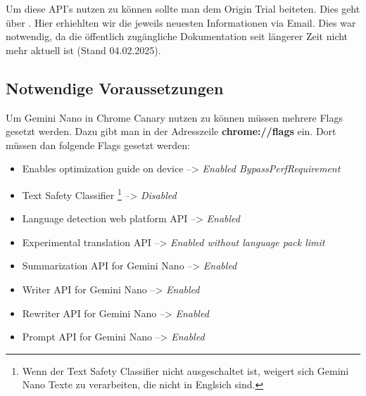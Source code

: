 Um diese API's nutzen zu können sollte man dem Origin Trial beiteten. Dies geht über \cite{gemini-nano-origin-trial}. Hier erhiehlten wir die jeweils neuesten Informationen via Email. Dies war notwendig, da die öffentlich zugängliche Dokumentation seit längerer Zeit nicht mehr aktuell ist (Stand 04.02.2025).

\subsection{Notwendige Voraussetzungen}

Um Gemini Nano in Chrome Canary nutzen zu können müssen mehrere Flags gesetzt werden. Dazu gibt man in der Adresszeile \textbf{chrome://flags} ein. Dort müssen dan folgende Flags gesetzt werden:
\begin{itemize}
    \item Enables optimization guide on device --> \emph{Enabled BypassPerfRequirement}
    \item Text Safety Classifier \footnote{Wenn der Text Safety Classifier nicht ausgeschaltet ist, weigert sich Gemini Nano Texte zu verarbeiten, die nicht in Englsich sind.} --> \emph{Disabled}
    \item Language detection web platform API --> \emph{Enabled}
    \item Experimental translation API --> \emph{Enabled without language pack limit}
    \item Summarization API for Gemini Nano --> \emph{Enabled}
    \item Writer API for Gemini Nano --> \emph{Enabled}
    \item Rewriter API for Gemini Nano --> \emph{Enabled}
    \item Prompt API for Gemini Nano --> \emph{Enabled}
\end{itemize}